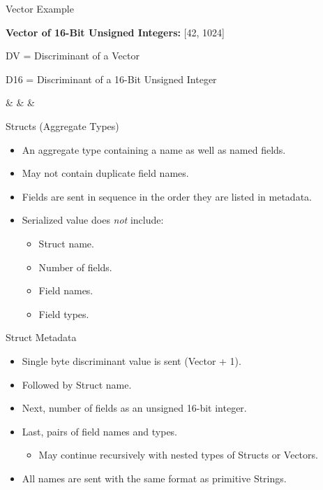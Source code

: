\documentclass{beamer}
\newcommand{\rot}[1]{\rotatebox{90}{#1}}
\begin{document}
\begin{frame}[fragile]{Vector Example}
	\begin{center}
		\textbf{Vector of 16-Bit Unsigned Integers:} [42, 1024]

		DV = Discriminant of a Vector

		D16 = Discriminant of a 16-Bit Unsigned Integer

		\begin{bytefield}{26}
			\bitbox{2}{\rot{DV}} & \bitbox{2}{\rot{D16}} &  &  \\
		\end{bytefield}
	\end{center}
\end{frame}

\begin{frame}{Structs (Aggregate Types)}
	\begin{itemize}
		\item	An aggregate type containing a name as well as named fields.
		\item May not contain duplicate field names.
		\item Fields are sent in sequence in the order they are listed in metadata.
		\item Serialized value does \emph{not} include:
		      \begin{itemize}
			      \item Struct name.
			      \item Number of fields.
			      \item Field names.
			      \item Field types.
		      \end{itemize}
	\end{itemize}
\end{frame}

\begin{frame}{Struct Metadata}
	\begin{itemize}
		\item Single byte discriminant value is sent (Vector + 1).
		\item Followed by Struct name.
		\item Next, number of fields as an unsigned 16-bit integer.
		\item Last, pairs of field names and types.
		      \begin{itemize}
			      \item May continue recursively with nested types of Structs or Vectors.
		      \end{itemize}
		\item All names are sent with the same format as primitive Strings.
	\end{itemize}
\end{frame}
\end{document}
